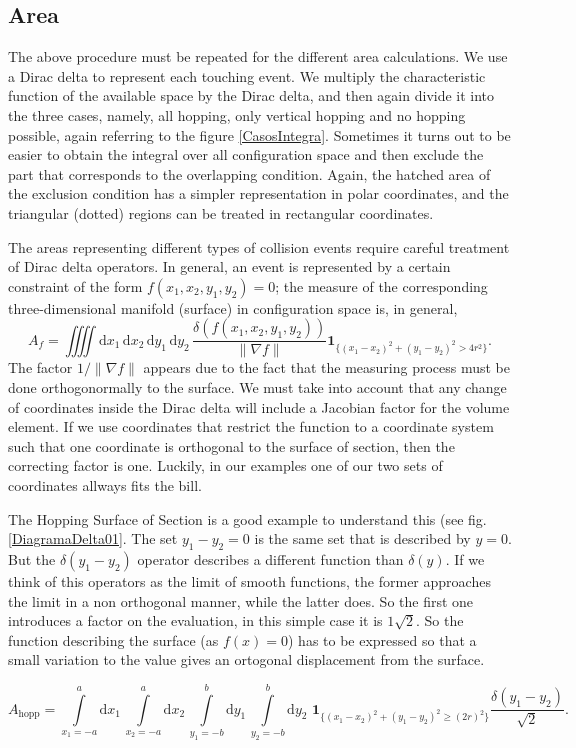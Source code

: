 \documentclass[superscriptaddress,pre,reprint,showpacs,onecolumn]{revtex4-1}
\newcommand{\rd}[1]{\mathrm{d}{#1} \,}
\newcommand{\indicator}[1]{\mathbf{1}_{ \{   #1 \} } }
\begin{document}
\subsection{Area}

The above procedure must be repeated for the different
area calculations. We use a Dirac delta to represent each touching
event. We multiply the characteristic function of the available space by the Dirac delta, and
then again divide it into the three cases, namely, all hopping, only vertical hopping
and no hopping possible, again referring to the figure \ref{CasosIntegra}.
Sometimes it turns out to be easier to obtain 
the integral  over all configuration space and then exclude the part that
corresponds to the overlapping condition. Again, the hatched area of the exclusion
condition has a simpler representation in polar coordinates, and the triangular
(dotted) regions can be treated in rectangular coordinates.

The areas representing different types of collision events require careful treatment of Dirac delta operators.
In general, an event is represented by a certain constraint of the form
$f(x_1, x_2 , y_1,y_2) =0 $; the measure of the corresponding three-dimensional manifold (surface) in configuration space is, in general,
\begin{equation}
  A_f=\iiiint \rd {x_1}  \rd {x_2}  \rd {y_1}  \rd {y_2}
  \frac{\delta(f(x_1, x_2 , y_1,y_2))}
  {\lVert \nabla f \rVert}
  \indicator{(x_1-x_2)^2+(y_1-y_2)^2>4r^2 }.
\end{equation}
The factor $1/ {\lVert \nabla f \rVert}$ appears due to the fact
that the measuring process must be done orthogonormally to the surface. 
We must take into account that any change of coordinates inside the Dirac delta will include
a Jacobian factor for the volume element. If we use coordinates that restrict
the function to a coordinate system such that  one  coordinate is orthogonal to the surface of section, then the correcting factor is one. Luckily, in
our examples one of our two sets of coordinates allways fits the bill. 

The Hopping Surface of Section is a good example to understand this (see fig. \ref{DiagramaDelta01}. The set  $y_1 - y_2=0$ is the same set that is described by $y=0$. But
the $\delta(y_1-y_2)$ operator describes a different function than $\delta(y)$. If we think of this operators as the limit of smooth functions, the former approaches
the limit in a non orthogonal manner, while the latter does. So the first one
introduces a factor on the evaluation, in this
simple case it is $1\sqrt{2}$. So the function describing the surface (as $f(x)=0$) has
to be expressed so that a small variation to the value gives an ortogonal
displacement from the surface. 
\begin{widetext}\label{ahopcart}
\begin{equation}
 A_\text{hopp} = \int \limits_{x_1 = -a}^a \rd {x_1} \int\limits_{x_2 = -a}^a \rd {x_2}
\int\limits_{y_1 = -b}^b \rd {y_1} \int\limits_{y_2 = -b}^b \rd {y_2} \, \indicator{ (x_1-x_2)^2 + (y_1-y_2)^2 \ge (2r)^2 } \frac{\delta(y_1-y_2)}{\sqrt{2}}.
\end{equation}
\end{widetext}
\end{document}
